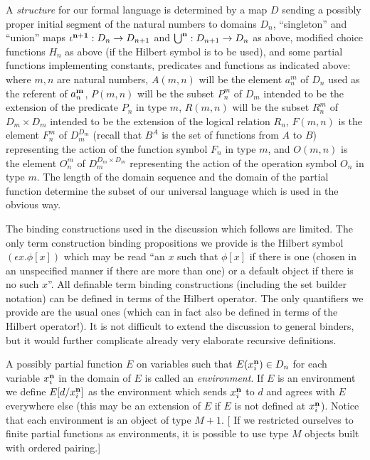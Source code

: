 \documentclass[12pt]{book}
\begin{document}
A {\em structure\/} for our formal language is determined by a map $D$
sending a possibly proper initial segment of the natural numbers to
domains $D_n$, ``singleton'' and ``union'' maps $\iota^{\bf n+1}:D_n
\rightarrow D_{n+1}$ and $\bigcup^{\bf n}:D_{n+1} \rightarrow D_n$ as above,
modified choice functions $H_n$ as above (if the Hilbert symbol is to
be used), and some partial functions implementing constants,
predicates and functions as indicated above: where $m,n$ are natural
numbers, $A(m,n)$ will be the element $a^m_n$ of $D_n$ used as the
referent of $a^{\bf m}_n$, $P(m,n)$ will be the subset $P^m_n$ of
$D_m$ intended to be the extension of the predicate $P_n$ in type $m$,
$R(m,n)$ will be the subset $R^m_n$ of $D_m \times D_m$ intended to be the
extension of the logical relation $R_n$, $F(m,n)$ is the element
$F^m_n$ of $D_m^{D_m}$ (recall that $B^A$ is the set of functions from $A$ to $B$) representing the action of the function symbol
$F_n$ in type $m$, and $O(m,n)$ is the element $O^m_n$ of
$D_m^{D_m\times D_m}$ representing the action of the operation symbol $O_n$ in
type $m$.  The length of the domain sequence and the domain of the
partial function determine the subset of our universal language which
is used in the obvious way.

The binding constructions used in the discussion which follows are
limited.  The only term construction binding propositions we provide
is the Hilbert symbol $(\epsilon x.\phi[x])$ which may be read ``an
$x$ such that $\phi[x]$ if there is one (chosen in an unspecified
manner if there are more than one) or a default object if there is no
such $x$''.  All definable term binding constructions (including the
set builder notation) can be defined in terms of the Hilbert operator.
The only quantifiers we provide are the usual ones (which can in fact
also be defined in terms of the Hilbert operator!).  It is not
difficult to extend the discussion to general binders, but it would
further complicate already very elaborate recursive definitions.

A possibly partial function $E$ on variables such that $E(x^{\bf n}_i)
\in D_{n}$ for each variable $x^{\bf n}_i$ in the domain of $E$ is
called an {\em environment\/}.  If $E$ is an environment we define
$E[d/x_i^{\bf n}]$ as the environment which sends $x^{\bf n}_i$ to $d$
and agrees with $E$ everywhere else (this may be an extension of $E$
if $E$ is not defined at $x_i^{\bf n}$).  Notice that each environment is an object
of type $M+1$.  [ If we restricted ourselves to finite partial functions as environments, it is possible
to use type $M$ objects built with ordered pairing.]
\end{document}
